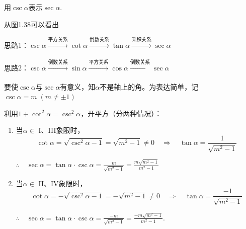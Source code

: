 \begin{example}
    用$\csc\alpha$表示$\sec\alpha$.
\end{example}

\begin{analyze}
从图1.38可以看出

思路1：$\csc\alpha\xrightarrow[]{\text{平方关系}}\cot\alpha\xrightarrow[]{\text{倒数关系}}\tan\alpha\xrightarrow[]{\text{乘积关系}}\sec\alpha$


思路2：$\csc\alpha\xrightarrow[]{\text{倒数关系}}\sin\alpha\xrightarrow[]{\text{平方关系}}\cos\alpha\xrightarrow[]{\text{倒数关系}}\sec\alpha$
\end{analyze}

\begin{figure}[htp]
    \centering
{}
    \caption{}
\end{figure}


\begin{solution}
要使$\csc\alpha$与$\sec\alpha$有意义，知$\alpha$不是轴上的角。为表达简单，记$\csc\alpha=m\; (m\ne \pm1)$

利用$1+\cot^2\alpha=\csc^2\alpha$，开平方（分两种情况）：
\begin{enumerate}[(1)]
    \item 当$\alpha\in$ I、III象限时，$$\cot\alpha=\sqrt{\csc^2\alpha-1}=\sqrt{m^2-1}\ne 0\quad \Rightarrow \quad \tan\alpha=\frac{1}{\sqrt{m^2-1}}$$

    $\therefore\quad \sec\alpha=\tan\alpha\cdot \csc\alpha=\frac{m}{\sqrt{m^2-1}}=\frac{m\sqrt{m^2-1}}{m^2-1}$
    \item 当$\alpha\in$ II、IV象限时，$$\cot\alpha=-\sqrt{\csc^2\alpha-1}=-\sqrt{m^2-1}\ne 0\quad \Rightarrow \quad \tan\alpha=\frac{-1}{\sqrt{m^2-1}}$$
    
    $\therefore\quad \sec\alpha=\tan\alpha\cdot \csc\alpha=\frac{-m}{\sqrt{m^2-1}}=\frac{-m\sqrt{m^2-1}}{m^2-1}$.
\end{enumerate}
\end{solution}

